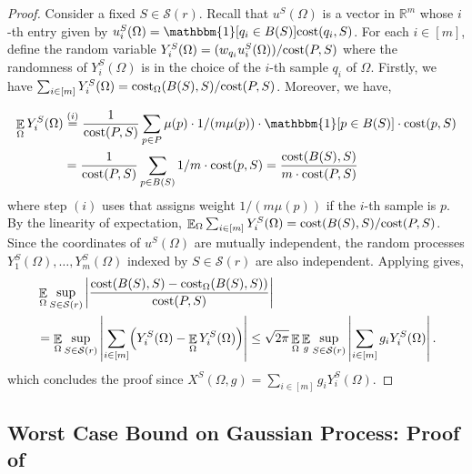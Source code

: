 \documentclass[11pt]{article}
\theoremstyle{restate}
\theoremstyle{definition}
\newcommand{\R}{\ensuremath{\mathbb{R}}}
\newcommand{\E}{\mathop{\mathbb{E}}}
\newcommand{\cost}{\textnormal{cost}}
\newcommand{\costom}{\cost_\Omega} %
\newcommand{\uq}[2]{u^{#1}_{#2}} %
\newcommand{\allcenters}{\mathcal{S}}
\newcommand{\csize}{m}
\newcommand{\inSR}{\in \mathcal{S}(r)}
\begin{document}
\begin{proof}
Consider a fixed $S \inSR$. Recall that $u^S(\Omega)$ is a vector in $\R^m$ whose $i$-th entry given by $u_i^S(\Omega) = \mathbbm{1}[q_i \in B(S)] \cost(q_i,S)$. 
 For each $i \in [\csize]$, define the random variable $Y^S_{i}(\Omega) = (w_{q_i} \uq{S}{i}(\Omega))/\cost(P,S)$ where the randomness of $Y^S_i(\Omega)$ is in the choice of the $i$-th sample $q_i$ of $\Omega$.  Firstly, we have $ \sum_{i \in [m]} Y_i^S(\Omega) = \costom(B(S), S)/\cost(P,S) $. Moreover, we have,

\begin{align*}
    \E_{\Omega} Y^{S}_{i} (\Omega) &\overset{(i)}{=} \frac{1}{\cost(P,S)}\sum_{p \in P} \mu(p) \cdot 1/(m \mu(p)) \cdot \mathbbm{1}[p \in B(S)] \cdot \cost(p,S) \\
    &= \frac{1}{\cost(P,S)} \sum_{p \in B(S)} 1/\csize \cdot \cost(p,S) = \frac{\cost(B(S),S)}{\csize \cdot \cost(P,S)}
\end{align*}
 where step $(i)$ uses that  assigns weight $1/(m \mu(p))$ if the $i$-th sample is $p$. By the linearity of expectation, $\E_{\Omega} \sum_{i \in [\csize]} Y^S_{i}(\Omega) = \cost(B(S),S)/\cost(P,S)$. Since the coordinates of $u^S(\Omega)$ are mutually independent, the random processes $Y^S_1(\Omega),\ldots, Y^S_m(\Omega)$ indexed by $S \in \allcenters(r)$ are also independent. Applying  gives,
\begin{align*}
		&\E_{ \Omega} \sup_{S\inSR} \left\lvert \frac{\cost(B(S),S)- \costom(B(S),S))}{\cost(P,S) }\right\rvert \\
        &= \E_{ \Omega} \sup_{S\inSR} \left\lvert \sum_{i \in [\csize]} \Bigl(Y^S_i(\Omega) - \E_{\Omega} Y^{S}_i(\Omega)\Bigr) \right\rvert \leq \sqrt{2\pi} \E_{ \Omega} \E_{g}\sup_{S\inSR} 
        \left\lvert \sum_{i \in [\csize]} g_i Y^S_i(\Omega)\right\rvert.
\end{align*}
which concludes the proof since $X^S(\Omega, g) = \sum_{i \in [m]} g_i Y^{S}_i(\Omega)$.
\end{proof}







\subsection{\texorpdfstring{Worst Case Bound on Gaussian Process: Proof of }{Worst Case Bound on Gaussian Process}}\label{app: proof-worst-case}
\end{document}
